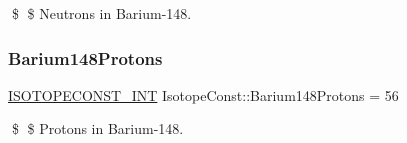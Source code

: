 \$ \$ Neutrons in Barium-\/148. \mbox{\label{group___isotope_const-_barium-_ba148_ga39a50a45e4c887066e1b6bb72a2dd9ba}} 
\subsubsection{\texorpdfstring{Barium148\+Protons}{Barium148Protons}}
{\footnotesize\ttfamily \mbox{\hyperlink{group___isotope_const-_macros_ga5f18360b3e99483a35c32d789e62621c}{I\+S\+O\+T\+O\+P\+E\+C\+O\+N\+S\+T\+\_\+\+I\+NT}} Isotope\+Const\+::\+Barium148\+Protons = 56}

\$ \$ Protons in Barium-\/148. 